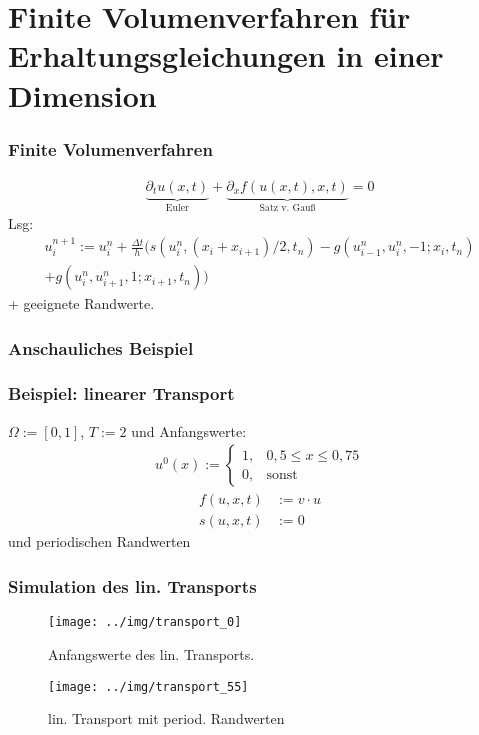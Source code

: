 \section{Finite Volumenverfahren für Erhaltungsgleichungen in einer Dimension}
\begin{frame}
\frametitle{Finite Volumenverfahren}
\begin{align}
\underbrace{\partial _t u(x,t)}_{\text{Euler}} + \underbrace{\partial _xf(u(x,t),x,t)}_{\text{Satz v. Gauß}} = 0
\end{align}
Lsg:
\begin{align}
u_i^{n+1}:=u_i^n+\frac{\Delta t}{h} (s(u_i^n,(x_i+x_{i+1})/2,t_n)-g(u_{i-1}^n,u_i^n,-1;x_i,t_n)\nonumber \\
+g(u_i^n,u_{i+1}^n,1;x_{i+1},t_n))
\end{align}
+ geeignete Randwerte.
\end{frame}
\begin{frame}
\frametitle{Anschauliches Beispiel}
\begin{figure}

\caption{}
\end{figure}
\end{frame}
\begin{frame}
\frametitle{Beispiel: linearer Transport}
$\Omega:=\left[0, 1\right]$, $T:=2$ und Anfangswerte:
\begin{align}
u^0(x):=\left\{\begin{array}{ll} 1, & 0{,}5\leq x \leq 0{,}75 \\
0, & \text{sonst}\end{array}\right.
\end{align}
\begin{align}
f(u,x,t)&:=v\cdot u\\
s(u,x,t)&:=0
\end{align}
und periodischen Randwerten
\end{frame}
\begin{frame}
\frametitle{Simulation des lin. Transports}
\begin{minipage}[t]{0.48\linewidth}
\begin{figure}
\centering
\texttt{[image: ../img/transport\_0]}
\caption{Anfangswerte des lin. Transports.}
\label{fig:transport_0}
\end{figure}
\end{minipage}
\begin{minipage}[t]{0.5\linewidth}
\begin{figure}
\centering
\texttt{[image: ../img/transport\_55]}
\caption{lin. Transport mit period. Randwerten}
\label{fig:transport_55}
\end{figure}

\end{minipage}
\end{frame}